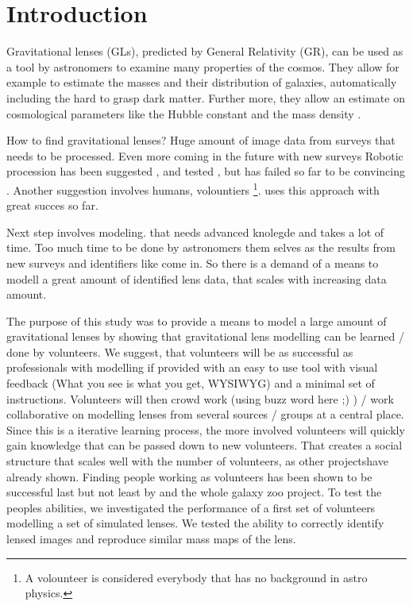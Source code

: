 \section{Introduction}


Gravitational lenses (GLs), predicted by General Relativity (GR), can be used as a tool by astronomers to examine many properties of the cosmos.
They allow for example to estimate the masses and their distribution of galaxies, automatically including the hard to grasp dark matter.
Further more, they allow an estimate on cosmological parameters like the Hubble constant \citep{Saha2006} and the mass density \needcite.


How to find gravitational lenses? Huge amount of image data from surveys that needs to be processed.
Even more coming in the future with new surveys \needcite
Robotic procession has been suggested \needcite, and tested \needcite, but has failed so far to be convincing \needcite.
Another suggestion involves humans, volountiers \footnote{A volounteer is considered everybody that has no background in astro physics.}.
\sw uses this approach with great succes so far.\needcite


Next step involves modeling. that needs advanced knolegde and takes a lot of time.
Too much time to be done by astronomers them selves as the results from new surveys and identifiers like \sw come in.
So there is a demand of a means to modell a great amount of identified lens data, that scales with increasing data amount.


The purpose of this study was to provide a means to model a large amount of gravitational lenses by showing that gravitational lens modelling can be learned / done by volunteers.
We suggest, that volunteers will be as successful as professionals with modelling if provided with an easy to use tool with visual feedback (What you see is what you get, WYSIWYG) and a minimal set of instructions.
Volunteers will then crowd work (using buzz word here ;) ) / work collaborative on modelling lenses from several sources / groups at a central place.
Since this is a iterative learning process, the more involved volunteers will quickly gain knowledge that can be passed down to new volunteers.
That creates a social structure that scales well with the number of volunteers, as other projects\needcite have already shown.
Finding people working as volunteers has been shown to be successful last but not least by \sw and the whole galaxy zoo project.
To test the peoples abilities, we investigated the performance of a first set of volunteers modelling a set of simulated lenses.
We tested the ability to correctly identify lensed images and reproduce similar mass maps of the lens.

